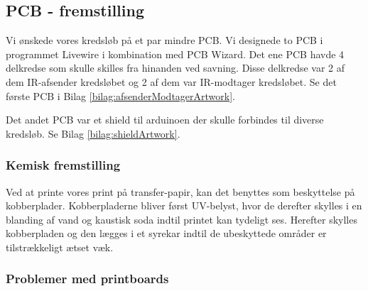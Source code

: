 \subsection{PCB - fremstilling}\label{subs:pcbfremstilling}
Vi ønskede vores kredsløb på et par mindre PCB. Vi designede to PCB i programmet Livewire i kombination med PCB Wizard. Det ene PCB havde 4 delkredse som skulle skilles fra hinanden ved savning. Disse delkredse var 2 af dem IR-afsender kredsløbet og 2 af dem var IR-modtager kredsløbet. Se det første PCB i Bilag \ref{bilag:afsenderModtagerArtwork}. 

Det andet PCB var et shield til arduinoen der skulle forbindes til diverse kredsløb. Se Bilag \ref{bilag:shieldArtwork}.
\subsubsection{Kemisk fremstilling}
Ved at printe vores print på transfer-papir, kan det benyttes som beskyttelse på kobberplader. Kobberpladerne bliver først UV-belyst, hvor de derefter skylles i en blanding af vand og kaustisk soda indtil printet kan tydeligt ses. Herefter skylles kobberpladen og den lægges i et syrekar indtil de ubeskyttede områder er tilstrækkeligt ætset væk.

\subsubsection{Problemer med printboards}


